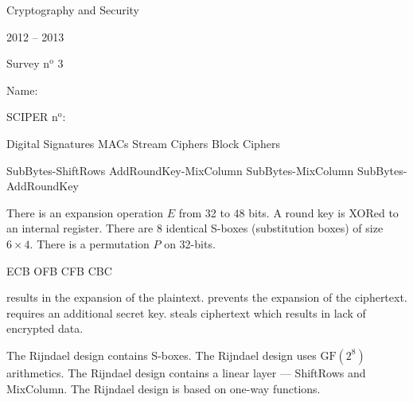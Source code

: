 \documentclass[11pt,a4paper]{report}
\begin{document}

\begin{center}
\sf
  \Large{Cryptography and Security}

  \vspace{0.3cm}
  \Large{2012 -- 2013}

  \vspace{0.3cm}
  \Large{Survey n$^{\text{o}}$ 3}

  \vspace{0.5cm}
\end{center}

\hfill{Name:~}{\vrule width 7cm height 0.4pt}

\bigskip

\hfill{SCIPER n$^{\text{o}}$:~}{\vrule width 7cm height 0.4pt}

\begin{comment}
 \question[]{}
 {}
 {}
 {}
 {}
\end{comment}

 {Digital Signatures}
 {MACs}
 {Stream Ciphers}
 {Block Ciphers}

 {SubBytes-ShiftRows}
 {AddRoundKey-MixColumn}
 {SubBytes-MixColumn}
 {SubBytes-AddRoundKey}

 
 
 {There is an expansion operation $E$ from 32 to 48 bits.}
{A round key is XORed to an internal register.}
{There are $8$ identical S-boxes (substitution boxes) of size $6 \times 4$.}
 {There is a permutation $P$ on 32-bits.}
 
 {ECB}
 {OFB}
 {CFB}
 {CBC}

 {results in the expansion  of the plaintext.}
 {prevents the expansion of the ciphertext.}
 {requires an additional secret key.}
 {steals ciphertext which results in lack of encrypted data.}


 {The Rijndael design contains S-boxes.}
 {The Rijndael design uses $\text{GF}(2^8)$ arithmetics.}
 {The Rijndael design contains a linear layer --- ShiftRows and MixColumn.}
 {The Rijndael design is based on one-way functions.}
\end{document}
